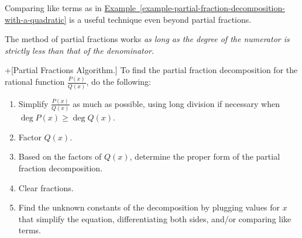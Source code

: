 \documentclass[10pt,]{book}
\theoremstyle{ptxplainnotitle}
\theoremstyle{ptxplaintitle}
\theoremstyle{ptxplainnotitle}
\theoremstyle{ptxplaintitle}
\theoremstyle{ptxplainnotitle}
\theoremstyle{ptxplaintitle}
\theoremstyle{ptxdefinitionnotitle}
\theoremstyle{ptxdefinitiontitle}
\theoremstyle{ptxdefinitionnotitle}
\theoremstyle{ptxdefinitiontitle}
\theoremstyle{ptxdefinitionnotitle}
\theoremstyle{ptxdefinitiontitle}
\theoremstyle{ptxdefinitionnotitle}
\theoremstyle{ptxdefinitiontitle}
\theoremstyle{ptxdefinitionnotitle}
\theoremstyle{ptxdefinitiontitle}
\numberwithin{equation}{section}
\begin{document}
\hypertarget{p-564}{}%
Comparing like terms as in \hyperref[example-partial-fraction-decomposition-with-a-quadratic]{Example~\ref{example-partial-fraction-decomposition-with-a-quadratic}} is a useful technique even beyond partial fractions.%
\par
\hypertarget{p-565}{}%
The method of partial fractions works \emph{as long as the degree of the numerator is strictly less than that of the denominator.}%
\begin{algorithm}+[{Partial Fractions Algorithm.}]\label{algorithm-partial-fractions-algorithm}
\hypertarget{p-566}{}%
To find the partial fraction decomposition for the rational function \(\frac{P(x)}{Q(x)}\), do the following: \leavevmode%
\begin{enumerate}
\item\hypertarget{li-47}{}Simplify \(\frac{P(x)}{Q(x)}\) as much as possible, using long division if necessary when \(\deg P(x) \geq \deg Q(x)\).%
\item\hypertarget{li-48}{}Factor \(Q(x)\).%
\item\hypertarget{li-49}{}Based on the factors of \(Q(x)\), determine the proper form of the partial fraction decomposition.%
\item\hypertarget{li-50}{}Clear fractions.%
\item\hypertarget{li-51}{}Find the unknown constants of the decomposition by plugging values for \(x\) that simplify the equation, differentiating both sides, and/or comparing like terms.%
\end{enumerate}
%
\end{algorithm}
\end{document}
